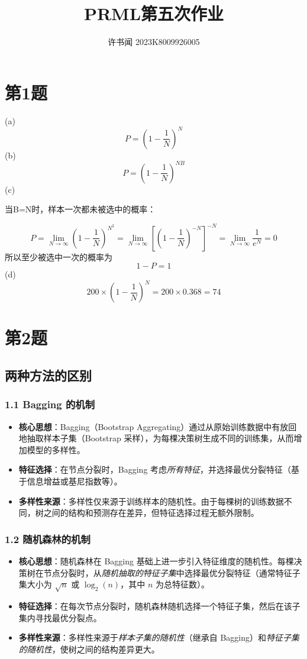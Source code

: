 \documentclass{article}
\begin{document}
\title{PRML第五次作业}
\author{许书闻 2023K8009926005}
\maketitle
\section*{第1题}
(a)
\[P=(1-\frac{1}{N})^N\]
(b)
\[P=(1-\frac{1}{N})^{NB}\]
(c)

当B=N时，样本一次都未被选中的概率：

\[P=\lim_{N \to \infty}(1-\frac{1}{N})^{N^2}=\lim_{N\to \infty}[(1-\frac{1}{N})^{-N}]^{-N}=\lim_{N\to\infty}\frac{1}{e^N}=0  \]  
所以至少被选中一次的概率为\[1-P=1\]
(d)
\[200\times (1-\frac{1}{N})^N=200\times 0.368=74\]

\section*{第2题}

\subsection*{两种方法的区别}

\subsubsection*{1.1 Bagging 的机制}
\begin{itemize}
    \item \textbf{核心思想}：Bagging（Bootstrap Aggregating）通过从原始训练数据中有放回地抽取样本子集（Bootstrap 采样），为每棵决策树生成不同的训练集，从而增加模型的多样性。
    \item \textbf{特征选择}：在节点分裂时，Bagging 考虑\emph{所有特征}，并选择最优分裂特征（基于信息增益或基尼指数等）。
    \item \textbf{多样性来源}：多样性仅来源于训练样本的随机性。由于每棵树的训练数据不同，树之间的结构和预测存在差异，但特征选择过程无额外限制。
\end{itemize}

\subsubsection*{1.2 随机森林的机制}
\begin{itemize}
    \item \textbf{核心思想}：随机森林在 Bagging 基础上进一步引入特征维度的随机性。每棵决策树在节点分裂时，从\emph{随机抽取的特征子集}中选择最优分裂特征（通常特征子集大小为 $\sqrt{n}$ 或 $\log_2(n)$，其中 $n$ 为总特征数）。
    \item \textbf{特征选择}：在每次节点分裂时，随机森林随机选择一个特征子集，然后在该子集内寻找最优分裂点。
    \item \textbf{多样性来源}：多样性来源于\emph{样本子集的随机性}（继承自 Bagging）和\emph{特征子集的随机性}，使树之间的结构差异更大。
\end{itemize}
\end{document}
